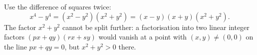 Use the difference of squares twice:
\[
x^4-y^4=(x^2-y^2)(x^2+y^2)=\boxed{(x-y)(x+y)(x^2+y^2)}.
\]
The factor $x^2+y^2$ cannot be split further: a factorisation into two linear integer factors $(px+qy)(rx+sy)$ would vanish at a point with $(x,y)\ne(0,0)$ on the line $px+qy=0$, but $x^2+y^2>0$ there.
